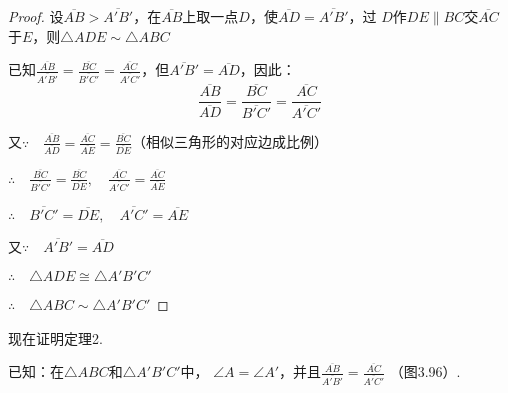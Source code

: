 \begin{figure}
    \centering
\begin{tikzpicture}

\end{tikzpicture}
    \caption{}
\end{figure}

\begin{proof}
    设$\overline{AB}>\overline{A'B'}$，在$\overline{AB}$上取一点$D$，使$\overline{AD}=\overline{A'B'}$，过
$D$作$DE\parallel BC$交$\overline{AC}$于$E$，则$\triangle ADE\sim \triangle ABC$

已知$\frac{\overline{AB}}{\overline{A'B'}}=\frac{\overline{BC}}{\overline{B'C'}}=\frac{\overline{AC}}{\overline{A'C'}}$，但$\overline{A'B'}=\overline{AD}$，因此：
\[\frac{\overline{AB}}{\overline{AD}}=\frac{\overline{BC}}{\overline{B'C'}}=\frac{\overline{AC}}{\overline{A'C'}}\]

又$\because\quad \frac{\overline{AB}}{\overline{AD}}=\frac{\overline{AC}}{\overline{AE}}=\frac{\overline{BC}}{\overline{DE}}$（相似三角形的对应边成比例）

$\therefore\quad  \frac{\overline{BC}}{\overline{B'C'}}=\frac{\overline{BC}}{\overline{DE}},\quad \frac{\overline{AC}}{\overline{A'C'}}=\frac{\overline{AC}}{\overline{AE}}$

$\therefore\quad \overline{B'C'}=\overline{DE},\quad \overline{A'C'}=\overline{AE}$

又$\because\quad \overline{A'B'}=\overline{AD}$

$\therefore\quad \triangle ADE\cong \triangle A'B'C'$

$\therefore\quad \triangle ABC\sim \triangle A'B'C'$
\end{proof}

现在证明定理2.

已知：在$\triangle ABC$和$\triangle A'B'C'$中，
$\angle A=\angle A'$，并且$\frac{\overline{AB}}{\overline{A'B'}}=\frac{\overline{AC}}{\overline{A'C'}}$
（图3.96）.

